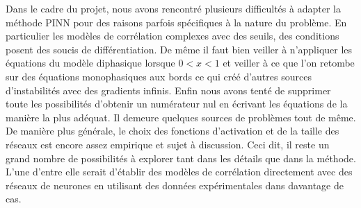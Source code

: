 Dans le cadre du projet, nous avons rencontré plusieurs difficultés à adapter la méthode PINN pour des raisons parfois spécifiques à la nature du problème. En particulier les modèles de corrélation complexes avec des seuils, des conditions posent des soucis de différentiation. De même il faut bien veiller à n'appliquer les équations du modèle diphasique lorsque $0<x<1$ et veiller à ce que l'on retombe sur des équations monophasiques aux bords ce qui créé d'autres sources d'instabilités avec des gradients infinis. Enfin nous avons tenté de supprimer toute les possibilités d'obtenir un numérateur nul en écrivant les équations de la manière la plus adéquat. Il demeure quelques sources de problèmes tout de même.\\

De manière plus générale, le choix des fonctions d'activation et de la taille des réseaux est encore assez empirique et sujet à discussion. Ceci dit, il reste un grand nombre de possibilités à explorer tant dans les détails que dans la méthode. L'une d'entre elle serait d'établir des modèles de corrélation directement avec des réseaux de neurones en utilisant des données expérimentales dans davantage de cas.

